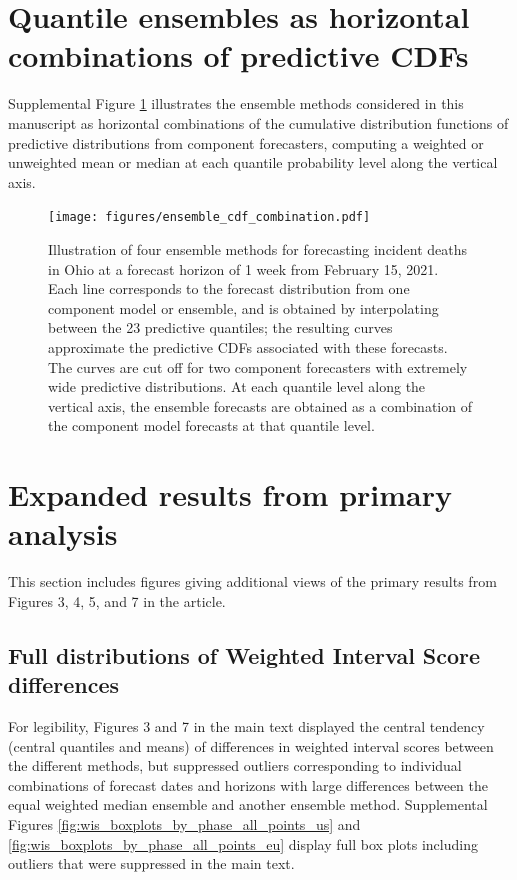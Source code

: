 \documentclass{article}
\begin{document}
\section{Quantile ensembles as horizontal combinations of predictive CDFs}

Supplemental Figure \ref{fig:ensemble_cdf_combination} illustrates the ensemble methods considered in this manuscript as horizontal combinations of the cumulative distribution functions of predictive distributions from component forecasters, computing a weighted or unweighted mean or median at each quantile probability level along the vertical axis.

\begin{figure}[H]
    \centering
    \texttt{[image: figures/ensemble\_cdf\_combination.pdf]}
    \caption{Illustration of four ensemble methods for forecasting incident deaths in Ohio at a forecast horizon of 1 week from February 15, 2021. Each line corresponds to the forecast distribution from one component model or ensemble, and is obtained by interpolating between the 23 predictive quantiles; the resulting curves approximate the predictive CDFs associated with these forecasts. The curves are cut off for two component forecasters with extremely wide predictive distributions. At each quantile level along the vertical axis, the ensemble forecasts are obtained as a combination of the component model forecasts at that quantile level.}
    \label{fig:ensemble_cdf_combination}
\end{figure}

\newpage

\section{Expanded results from primary analysis}

This section includes figures giving additional views of the primary results from Figures 3, 4, 5, and 7 in the article.

\subsection{Full distributions of Weighted Interval Score differences}

For legibility, Figures 3 and 7 in the main text displayed the central tendency (central quantiles and means) of differences in weighted interval scores between the different methods, but suppressed outliers corresponding to individual combinations of forecast dates and horizons with large differences between the equal weighted median ensemble and another ensemble method. Supplemental Figures \ref{fig:wis_boxplots_by_phase_all_points_us} and \ref{fig:wis_boxplots_by_phase_all_points_eu} display full box plots including outliers that were suppressed in the main text.
\end{document}
